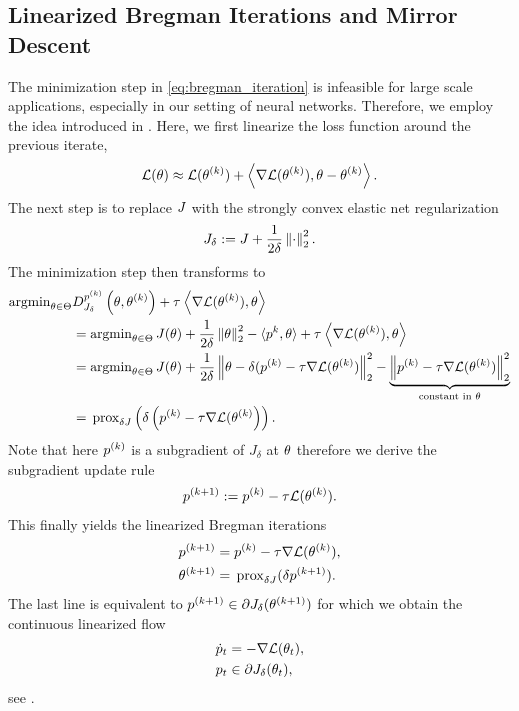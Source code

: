 \subsection{Linearized Bregman Iterations and Mirror Descent}
%
The minimization step in \cref{eq:bregman_iteration} is infeasible for large scale applications, especially in our setting of neural networks. Therefore, we employ the idea introduced in \cite{yin2008bregman, cai2009convergence}. Here, we first linearize the loss function around the previous iterate,
%
\begin{align*}
\mathcal{L}(\theta) \approx \mathcal{L}(\theta^{(k)}) + 
\left\langle \nabla\mathcal{L}(\theta^{(k)}), \theta - \theta^{(k)}
\right\rangle.
\end{align*} 
%
The next step is to replace $J$ with the strongly convex elastic net regularization%
\begin{align}\label{eq:elastic_net}
J_\delta:= J + \frac{1}{2\delta}\left\|\cdot\right\|^2_2.
\end{align}
%
The minimization step then transforms to
%
\begin{align}\label{eq:LinBregDer}
\argmin_{\param\in\Param} &D^{\sg^{(k)}}_{\func_\delta} \left(\param,\param^{(k)}\right) + \tau^{}\left\langle \nabla\empLoss(\param^{(k)}), \param
\right\rangle\\&= 
\argmin_{\param\in\Param}
J(\param) + \frac{1}{2\delta} \norm{\param}^{2}_2 - 
\langle \sg^{k}, \param\rangle +
\tau^{}\left\langle \nabla\empLoss(\param^{(k)}), \param
\right\rangle\nonumber\\
&=
\argmin_{\param\in\Param}
J(\param) + \frac{1}{2\delta} \norm{\param - \delta(\sg^{(k)} -\tau \nabla\empLoss(\param^{(k)})}^2_2 - \underbrace{\norm{\sg^{(k)} -\tau \nabla\empLoss(\param^{(k)})}^2_2}_{\text{constant in } \param}\nonumber\\
&=
\prox{\delta \func}\left(\delta\left(\sg^{(k)} -\tau \nabla\empLoss(\param^{(k)}\right)\right).\nonumber%
\end{align}
%
Note that here $p^{(k)}$ is a subgradient of $J_\delta$ at $\theta$ therefore we derive the subgradient update rule
%
\begin{align*}
p^{(k+1)} := p^{(k)} - \tau \mathcal{L}(\theta^{(k)}).
\end{align*}
%
This finally yields the linearized Bregman iterations
%
\begin{subequations}\label{eq:lin_bregman_iteration}
\begin{align}
p^{(k+1)} &= p^{(k)} - \tau \nabla\mathcal{L}(\theta^{(k)}),\\
\theta^{(k+1)} &= \,\mathrm{prox}_{\delta J}(\delta p^{(k+1)}).
\end{align}
\end{subequations}
%
%
The last line is equivalent to $p^{(k+1)}\in\partial J_\delta(\theta^{(k+1)})$ for which we obtain the continuous linearized flow
%
\begin{align*}
\dot{p}_t &= -\nabla \mathcal{L}(\theta_t),\\
p_t &\in \partial J_\delta(\theta_t),
\end{align*}
%
see \cite{burger2006nonlinear,burger2007inverse}.
%
%

